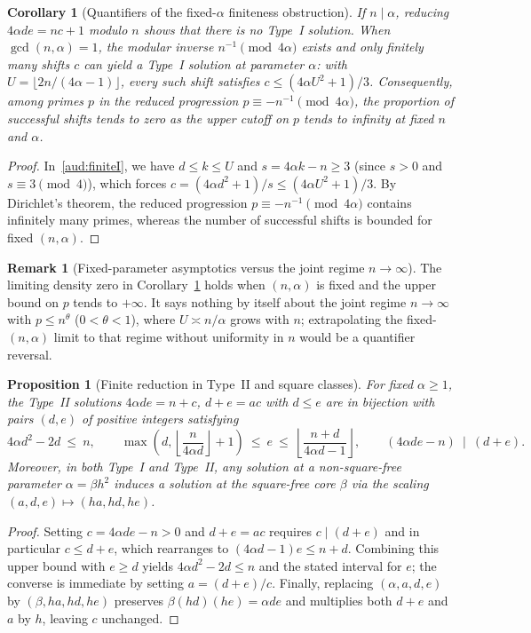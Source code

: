 \documentclass[11pt, a4paper]{article}
\theoremstyle{plain}
\newtheorem{corollary}[theorem]{Corollary}
\newtheorem{proposition}[theorem]{Proposition}
\theoremstyle{definition}
\newtheorem{remark}[theorem]{Remark}
\begin{document}
\begin{corollary}[Quantifiers of the fixed-$\alpha$ finiteness obstruction]\label{aud:finitequantifiers}
If $n\mid\alpha$, reducing $4\alpha de=nc+1$ modulo $n$ shows that there is no Type~I solution. When $\gcd(n,\alpha)=1$, the modular inverse $n^{-1}\pmod{4\alpha}$ exists and only finitely many shifts $c$ can yield a Type~I solution at parameter $\alpha$: with $U=\lfloor 2n/(4\alpha-1)\rfloor$, every such shift satisfies $c\le(4\alpha U^{2}+1)/3$. Consequently, among primes $p$ in the reduced progression $p\equiv -n^{-1}\pmod{4\alpha}$, the proportion of successful shifts tends to zero as the upper cutoff on $p$ tends to infinity \emph{at fixed $n$ and $\alpha$}.
\end{corollary}
\begin{proof}
In~\eqref{aud:finiteI}, we have $d\le k\le U$ and $s=4\alpha k-n\ge 3$ (since $s>0$ and $s\equiv 3\pmod 4$), which forces $c=(4\alpha d^{2}+1)/s\le(4\alpha U^{2}+1)/3$. By Dirichlet's theorem, the reduced progression $p\equiv -n^{-1}\pmod{4\alpha}$ contains infinitely many primes, whereas the number of successful shifts is bounded for fixed $(n,\alpha)$.
\end{proof}

\begin{remark}[Fixed-parameter asymptotics versus the joint regime $n\to\infty$]
The limiting density zero in Corollary~\ref{aud:finitequantifiers} holds when $(n,\alpha)$ is fixed and the upper bound on $p$ tends to $+\infty$. It says nothing by itself about the joint regime $n\to\infty$ with $p\le n^{\theta}$ ($0<\theta<1$), where $U\asymp n/\alpha$ grows with $n$; extrapolating the fixed-$(n,\alpha)$ limit to that regime without uniformity in $n$ would be a quantifier reversal.
\end{remark}

\begin{proposition}[Finite reduction in Type~II and square classes]\label{aud:fixedalphaII}
For fixed $\alpha\ge 1$, the Type~II solutions $4\alpha de=n+c$, $d+e=ac$ with $d\le e$ are in bijection with pairs $(d,e)$ of positive integers satisfying
\[
4\alpha d^{2}-2d\ \le\ n,\qquad \max\!\left(d,\left\lfloor\frac{n}{4\alpha d}\right\rfloor+1\right)\ \le\ e\ \le\ \left\lfloor\frac{n+d}{4\alpha d-1}\right\rfloor,\qquad (4\alpha de-n)\ \mid\ (d+e).
\]
Moreover, in both Type~I and Type~II, any solution at a non-square-free parameter $\alpha=\beta h^{2}$ induces a solution at the square-free core $\beta$ via the scaling $(a,d,e)\mapsto(ha,hd,he)$.
\end{proposition}
\begin{proof}
Setting $c=4\alpha de-n>0$ and $d+e=ac$ requires $c\mid(d+e)$ and in particular $c\le d+e$, which rearranges to $(4\alpha d-1)e\le n+d$. Combining this upper bound with $e\ge d$ yields $4\alpha d^{2}-2d\le n$ and the stated interval for $e$; the converse is immediate by setting $a=(d+e)/c$. Finally, replacing $(\alpha,a,d,e)$ by $(\beta,ha,hd,he)$ preserves $\beta(hd)(he)=\alpha de$ and multiplies both $d+e$ and $a$ by $h$, leaving $c$ unchanged.
\end{proof}
\end{document}
